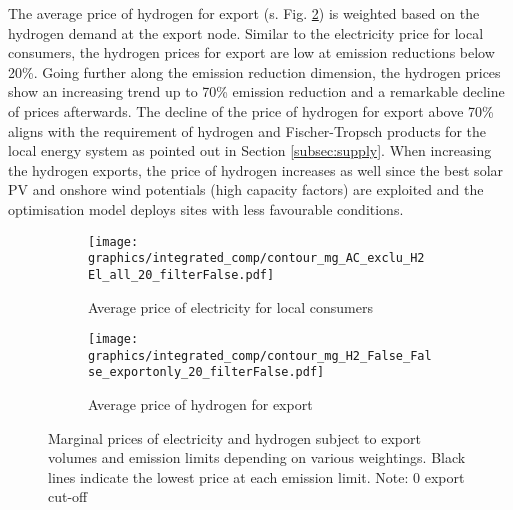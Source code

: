 The average price of hydrogen for export (s. Fig. \ref{fig:export_hy_price}) is weighted based on the hydrogen demand at the export node. Similar to the electricity price for local consumers, the hydrogen prices for export are low at emission reductions below 20\%. Going further along the emission reduction dimension, the hydrogen prices show an increasing trend up to 70\% emission reduction and a remarkable decline of prices afterwards. The decline of the price of hydrogen for export above 70\% aligns with the requirement of hydrogen and Fischer-Tropsch products for the local energy system as pointed out in Section \ref{subsec:supply}. %
When increasing the hydrogen exports, the price of hydrogen increases as well since the best solar PV and onshore wind potentials (high capacity factors) are exploited and the optimisation model deploys sites with less favourable conditions. 


\begin{figure*}[t] %
    \centering
    \begin{subfigure}[b]{0.49\linewidth}
        \centering
        \texttt{[image: graphics/integrated\_comp/contour\_mg\_AC\_exclu\_H2 El\_all\_20\_filterFalse.pdf]}
        \caption{Average price of electricity for local consumers}
        \label{fig:local_el_price}
    \end{subfigure}
    \hfill
    \begin{subfigure}[b]{0.49\linewidth}
        \centering
        \texttt{[image: graphics/integrated\_comp/contour\_mg\_H2\_False\_False\_exportonly\_20\_filterFalse.pdf]}
        \caption{Average price of hydrogen for export}
        \label{fig:export_hy_price}
    \end{subfigure}
    \hfill
    \caption{Marginal prices of electricity and hydrogen subject to export volumes and emission limits depending on various weightings. Black lines indicate the lowest price at each emission limit. Note: 0 export cut-off}
    \label{fig:marginal_prices}
\end{figure*}

